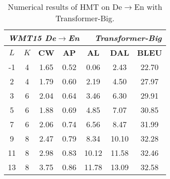 \documentclass{article} %
\begin{document}
\begin{table}[h]
\small
\centering
\caption{Numerical results of HMT on De$\rightarrow$En with Transformer-Big.}
\label{table:deen_big_res}
\vspace{-0.05in}
\begin{tabular}{cc|cccc|c} \hline
\multicolumn{7}{c}{\textit{\textbf{WMT15 De$\rightarrow$En $\;\;\;\;$ Transformer-Big}}}                                   \\ \hline
$L$ & $K$ & \textbf{CW} & \textbf{AP} & \textbf{AL} & \textbf{DAL} & \textbf{BLEU} \\ \hline
-1 & 4 & 1.65 & 0.52 & 0.06  & 2.43  & 22.70 \\
2  & 4 & 1.79 & 0.60 & 2.19  & 4.50  & 27.97 \\
3  & 6 & 2.04 & 0.64 & 3.46  & 6.30  & 29.91 \\
5  & 6 & 1.88 & 0.69 & 4.85  & 7.07  & 30.85 \\
7  & 6 & 2.06 & 0.74 & 6.56  & 8.47  & 31.99 \\
9  & 8 & 2.47 & 0.79 & 8.34  & $\!\!\!$10.10 & 32.28 \\
11 & 8 & 2.98 & 0.83 & $\!\!\!$10.12 & $\!\!\!$11.58 & 32.46 \\
13 & 8 & 3.75 & 0.86 & $\!\!\!$11.78 & $\!\!\!$13.09 & 32.58        \\\hline
\end{tabular}
\end{table}
\end{document}
